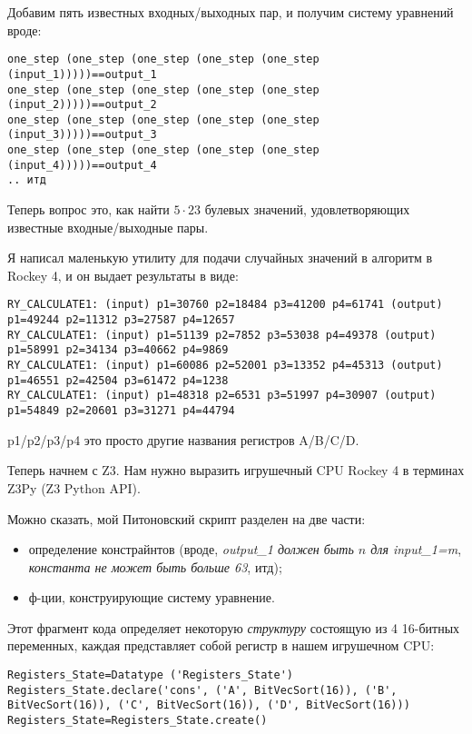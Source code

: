 Добавим пять известных входных/выходных пар, и получим систему уравнений вроде:

\begin{lstlisting}
one_step (one_step (one_step (one_step (one_step (input_1)))))==output_1
one_step (one_step (one_step (one_step (one_step (input_2)))))==output_2
one_step (one_step (one_step (one_step (one_step (input_3)))))==output_3
one_step (one_step (one_step (one_step (one_step (input_4)))))==output_4
.. итд
\end{lstlisting}

Теперь вопрос это, как найти $5 \cdot 23$ булевых значений, удовлетворяющих известные входные/выходные пары.

Я написал маленькую утилиту для подачи случайных значений в алгоритм в Rockey 4, и он выдает результаты в виде:

\begin{lstlisting}
RY_CALCULATE1: (input) p1=30760 p2=18484 p3=41200 p4=61741 (output) p1=49244 p2=11312 p3=27587 p4=12657
RY_CALCULATE1: (input) p1=51139 p2=7852 p3=53038 p4=49378 (output) p1=58991 p2=34134 p3=40662 p4=9869
RY_CALCULATE1: (input) p1=60086 p2=52001 p3=13352 p4=45313 (output) p1=46551 p2=42504 p3=61472 p4=1238
RY_CALCULATE1: (input) p1=48318 p2=6531 p3=51997 p4=30907 (output) p1=54849 p2=20601 p3=31271 p4=44794
\end{lstlisting}

p1/p2/p3/p4 это просто другие названия регистров A/B/C/D.

Теперь начнем с Z3. Нам нужно выразить игрушечный CPU Rockey 4 в терминах Z3Py (Z3 Python \ac{API}).

Можно сказать, мой Питоновский скрипт разделен на две части:

\begin{itemize}
\item определение констрайнтов (вроде, \textit{output\_1 должен быть $n$ для input\_1=m},
\textit{константа не может быть больше 63}, итд); 

\item ф-ции, конструирующие систему уравнение.
\end{itemize}

Этот фрагмент кода определяет некоторую \textit{структуру} состоящую из 4 16-битных переменных,
каждая представляет собой регистр в нашем игрушечном \ac{CPU}:

\begin{lstlisting}
Registers_State=Datatype ('Registers_State')
Registers_State.declare('cons', ('A', BitVecSort(16)), ('B', BitVecSort(16)), ('C', BitVecSort(16)), ('D', BitVecSort(16)))
Registers_State=Registers_State.create()
\end{lstlisting}

